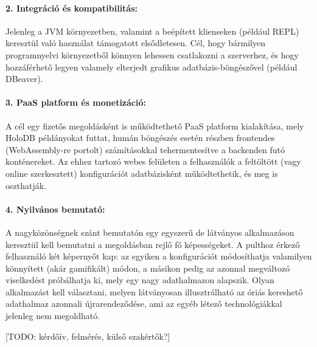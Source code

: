 \documentclass[12pt]{article}
\begin{document}
\paragraph{2. Integráció és kompatibilitás:}
Jelenleg a JVM környezetben, valamint a beépített klienseken (például REPL) keresztül való használat támogatott elsődletesen.
Cél, hogy bármilyen programnyelvi környezetből könnyen lehessen csatlakozni a szerverhez,
és hogy hozzáférhető legyen valamely elterjedt grafikus adatbázis-böngészővel (például DBeaver).

\paragraph{3. PaaS platform és monetizáció:}
A cél egy fizetős megoldásként is működtethető \mbox{PaaS} platform kialakítása,
mely HoloDB példányokat futtat,
humán böngészés esetén részben frontendes (WebAssembly-re portolt) számításokkal tehermentesítve a backenden futó konténereket.
Az ehhez tartozó webes felületen a felhasználók a feltöltött (vagy online szerkesztett)
konfigurációt adatbázisként működtethetik, és meg is oszthatják.

\paragraph{4. Nyilvános bemutató:}
A nagyközönségnek szánt bemutatón egy egyszerű de látványos alkalmazáson keresztül kell bemutatni a megoldásban rejlő fő képességeket.
A pulthoz érkező felhasználó két képernyőt kap:
az egyiken a konfigurációt módosíthatja valamilyen könnyített (akár gamifikált) módon,
a másikon pedig az azonnal megváltozó viselkedést próbálhatja ki, mely egy nagy adathalmazon alapszik.
Olyan alkalmazást kell választani, melyen látványosan illusztrálható az óriás kereshető adathalmaz azonnali újrarendeződése,
ami az egyéb létező technológiákkal jelenleg nem megoldható.

[TODO: kérdőív, felmérés, külső szakértők?]
\end{document}
